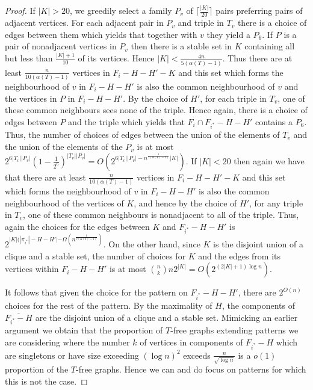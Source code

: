 \documentclass[12pt]{article}
\theoremstyle{definition}
\begin{document}
\begin{proof}
If $|K| >20$, we greedily  select a family $P_v$   of $\lceil \frac{|K|}{20} \rceil$ pairs 
preferring pairs of adjacent vertices. For each  adjacent pair in $P_v$ and triple in $T_v$ there is a choice of edges between them which yields that together 
with $v$ they yield a $P_6$. If $P$ is a pair of nonadjacent vertices in $P_v$ then there is a stable set in $K$ containing all but  less than $\frac{|K|+1}{10}$ of its 
vertices. Hence $|K|<\frac{4n}{5(\alpha(T)-1)}$. Thus there are at least $\frac{n}{10(\alpha(T)-1)}$ vertices in $F_i-H-H'-K$ and this set which forms the neighbourhood of $v$ 
in $F_i-H-H'$ is also the common neighbourhood of $v$ and the vertices in $P$ in $F_i-H-H'$. By the choice of $H'$, for each triple  in $T_v$, one of these common neighbours 
sees none of the triple.  Hence again,  there is a choice of edges between $P$ and the triple  which yields that $F_i \cap F_{i^*}-H-H'$
contains  a $P_6$. Thus, the number of choices of edges between the union of the elements of $T_v$ and the union of the elements 
of the $P_v$ is at most $2^{6|T_v||P_v|}(1-\frac{1}{2^6})^{|T_v||P_v|}= O( 2^{6|T_v||P_v|- n^{\frac{1}{7(\alpha(T)-1)}}|K|})$. 
If $|K|<20$ then again we have that there are at least $\frac{n}{10(\alpha(T)-1)}$ vertices in $F_i-H-H'-K$ and this set which forms the neighbourhood of $v$ 
in $F_i-H-H'$ is also the common neighbourhood of the vertices of $K$, and hence by the choice of $H'$, for any triple in $T_v$, one of these common neighbours 
is nonadjacent to all of the triple. 
Thus, again the choices for the edges between $K$ and $F_{i^*}-H-H'$ is $2^{|K|(|\pi_{i^*}|-H-H'|-\Omega(n^\frac{1}{7(\alpha(T)-1)})}$. 
On the other hand,  since $K$ is the disjoint union of a clique and a stable set, the number of choices for $K$ and the edges from its vertices within $F_i-H-H'$  is at most ${n \choose k}n 2^{|K|}=O(2^{(2|K|+1)\log n})$. 

It  follows that given  the choice for the pattern 
on $F_{i^*}-H-H'$, there are $2^{O(n)}$ choices for the rest of the pattern. By the maximality of $H$,  the components  of $\overline{F_{i^*}-H}$
are the disjoint union of a clique and a stable set. Mimicking an earlier argument we obtain that the proportion of $T$-free graphs extending patterns we are considering where 
the number $k$ of  vertices in components of $F_{i^*}-H$ which are singletons or have size exceeding $(\log n)^2$  exceeds  $\frac{n}{\sqrt{\log n}}$ is a $o(1)$ proportion 
of the $T$-free graphs.  Hence we can and do focus on patterns for which this is not the case. 


\end{proof}
\end{document}
